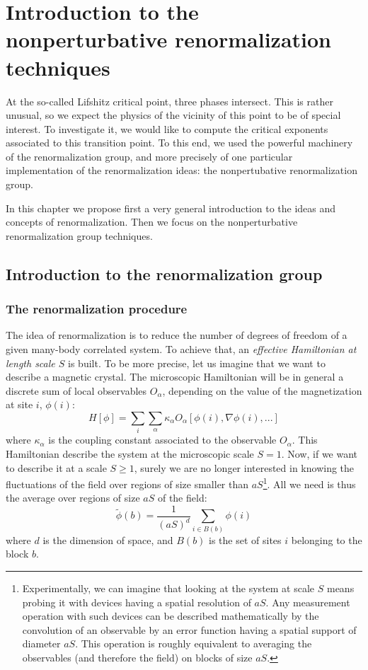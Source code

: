 \chapter{Introduction to the nonperturbative renormalization techniques}

At the so-called Lifshitz critical point, three phases intersect. This is rather unusual, so we expect the physics of the vicinity of this point to be of special interest. To investigate it, we would like to compute the critical exponents associated to this transition point. To this end, we used the powerful machinery of the renormalization group, and more precisely of one particular implementation of the renormalization ideas: the nonpertubative renormalization group.

In this chapter we propose first a very general introduction to the ideas and concepts of renormalization. Then we focus on the nonperturbative renormalization group techniques.

\section{Introduction to the renormalization group}

\subsection{The renormalization procedure}

The idea of renormalization is to reduce the number of degrees of freedom of a given many-body correlated system.
To achieve that, an \textit{effective Hamiltonian at length scale $S$} is built. 
To be more precise, let us imagine that we want to describe a magnetic crystal. The microscopic Hamiltonian will be in general a discrete sum of local observables $O_\alpha$, depending on the value of the magnetization at site $i$, $\phi(i)$:
\begin{equation}
H[\phi] = \sum_i \sum_\alpha \kappa_\alpha O_\alpha[\phi(i), \nabla \phi(i), ...]
\end{equation}
where $\kappa_\alpha$ is the coupling constant associated to the observable $O_\alpha$. 
This Hamiltonian describe the system at the microscopic scale $S=1$. Now, if we want to describe it at a scale $S \geq 1$, surely we are no longer interested in knowing the fluctuations of the field over regions of size smaller than $a S$\footnote{Experimentally, we can imagine that looking at the system at scale $S$ means probing it with devices having a spatial resolution of $a S$. Any measurement operation with such devices can be described mathematically by the convolution of an observable by an error function having a spatial support of diameter $a S$. This operation is roughly equivalent to averaging the observables (and therefore the field) on blocks of size $a S$.}. All we need is thus the average over regions of size $a S$ of the field:
\begin{equation}
\tilde{\phi}(b) = \frac{1}{(aS)^d} \sum_{i \in B(b)} \phi(i)
\end{equation}
where $d$ is the dimension of space, and $B(b)$ is the set of sites $i$ belonging to the block $b$.

